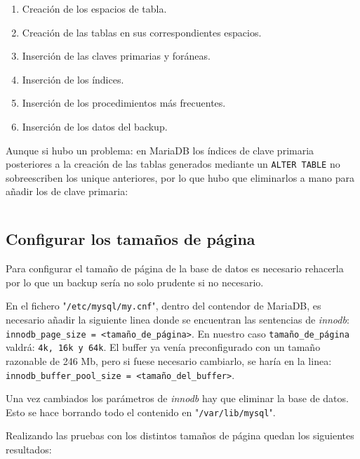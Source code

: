 \documentclass[a4paper, 11pt, oneside]{article} %
\newcommand{\scriptdir}{../scripts/} %
\begin{document}
\begin{enumerate}
	\item Creación de los espacios de tabla.
	\item Creación de las tablas en sus correspondientes espacios.
	\item Inserción de las claves primarias y foráneas.
	\item Inserción de los índices.
	\item Inserción de los procedimientos más frecuentes.
	\item Inserción de los datos del backup.
\end{enumerate}

Aunque si hubo un problema: en MariaDB los índices de clave primaria posteriores a la creación de las tablas generados mediante un \texttt{ALTER TABLE} no sobreescriben los unique anteriores, por lo que hubo que eliminarlos a mano para añadir los de clave primaria:

\inputminted{mysql}{\scriptdir remplazar_indices_pk_xammp.sql}




\subsection{Configurar los tamaños de página}

Para configurar el tamaño de página de la base de datos es necesario rehacerla por lo que un backup sería no solo prudente si no necesario.

En el fichero "\texttt{/etc/mysql/my.cnf}", dentro del contendor de MariaDB, es necesario añadir la siguiente linea donde se encuentran las sentencias de \emph{innodb}: \texttt{innodb_page_size = <tamaño_de_página>}. En nuestro caso \texttt{tamaño_de_página} valdrá: \texttt{4k, 16k y 64k}. El buffer ya venía preconfigurado con un tamaño razonable de 246 Mb, pero si fuese necesario cambiarlo, se haría en la linea: \texttt{innodb_buffer_pool_size = <tamaño_del_buffer>}.

Una vez cambiados los parámetros de \emph{innodb} hay que eliminar la base de datos. Esto se hace borrando todo el contenido en "\texttt{/var/lib/mysql}".

Realizando las pruebas con los distintos tamaños de página quedan los siguientes resultados:
\end{document}

